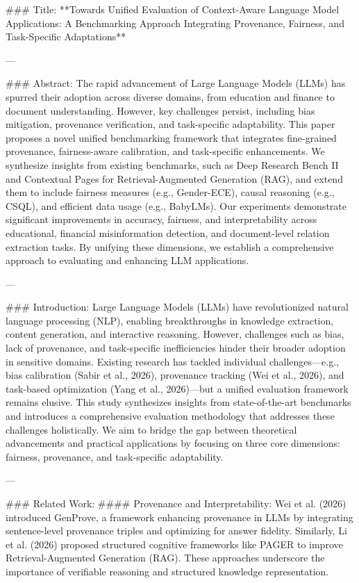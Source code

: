 ### Title:
**Towards Unified Evaluation of Context-Aware Language Model Applications: A Benchmarking Approach Integrating Provenance, Fairness, and Task-Specific Adaptations**

---

### Abstract:
The rapid advancement of Large Language Models (LLMs) has spurred their adoption across diverse domains, from education and finance to document understanding. However, key challenges persist, including bias mitigation, provenance verification, and task-specific adaptability. This paper proposes a novel unified benchmarking framework that integrates fine-grained provenance, fairness-aware calibration, and task-specific enhancements. We synthesize insights from existing benchmarks, such as Deep Research Bench II and Contextual Pages for Retrieval-Augmented Generation (RAG), and extend them to include fairness measures (e.g., Gender-ECE), causal reasoning (e.g., CSQL), and efficient data usage (e.g., BabyLMs). Our experiments demonstrate significant improvements in accuracy, fairness, and interpretability across educational, financial misinformation detection, and document-level relation extraction tasks. By unifying these dimensions, we establish a comprehensive approach to evaluating and enhancing LLM applications.

---

### Introduction:
Large Language Models (LLMs) have revolutionized natural language processing (NLP), enabling breakthroughs in knowledge extraction, content generation, and interactive reasoning. However, challenges such as bias, lack of provenance, and task-specific inefficiencies hinder their broader adoption in sensitive domains. Existing research has tackled individual challenges—e.g., bias calibration (Sabir et al., 2026), provenance tracking (Wei et al., 2026), and task-based optimization (Yang et al., 2026)—but a unified evaluation framework remains elusive. This study synthesizes insights from state-of-the-art benchmarks and introduces a comprehensive evaluation methodology that addresses these challenges holistically. We aim to bridge the gap between theoretical advancements and practical applications by focusing on three core dimensions: fairness, provenance, and task-specific adaptability.

---

### Related Work:
#### Provenance and Interpretability:
Wei et al. (2026) introduced GenProve, a framework enhancing provenance in LLMs by integrating sentence-level provenance triples and optimizing for answer fidelity. Similarly, Li et al. (2026) proposed structured cognitive frameworks like PAGER to improve Retrieval-Augmented Generation (RAG). These approaches underscore the importance of verifiable reasoning and structured knowledge representation.

